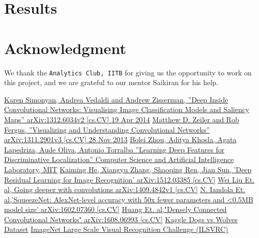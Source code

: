 \documentclass[conference]{IEEEtran}
\begin{document}
\section{Results}



\section*{Acknowledgment}

We thank the \texttt{Analytics Club, IITB} for giving us the opportunity to work on this project, and we are grateful to our mentor Saikiran for his help.
\newpage
\begin{thebibliography}{00}
 \href{https://arxiv.org/pdf/1312.6034.pdf}{Karen Simonyan, Andrea Vedaldi and Andrew Zisserman, ''Deep Inside Convolutional Networks: Visualising
Image Classification Models and Saliency Maps'' arXiv:1312.6034v2 [cs.CV] 19 Apr 2014}
 \href{https://arxiv.org/pdf/1311.2901.pdf}{Matthew D. Zeiler and Rob Fergus, ''Visualizing and Understanding Convolutional Networks'' arXiv:1311.2901v3 [cs.CV] 28 Nov 2013}
 \href{http://cnnlocalization.csail.mit.edu/Zhou_Learning_Deep_Features_CVPR_2016_paper.pdf}{Bolei Zhou, Aditya Khosla, Agata Lapedriza, Aude Oliva, Antonio Torralba ''Learning Deep Features for Discriminative Localization'' Computer Science and Artificial Intelligence Laboratory, MIT}
 \href{https://arxiv.org/pdf/1512.03385.pdf}{Kaiming He, Xiangyu Zhang, Shaoqing Ren, Jian Sun, 'Deep Residual Learning for Image Recognition' arXiv:1512.03385 [cs.CV]}
 \href{https://arxiv.org/pdf/1409.4842.pdf}{Wei Liu Et. al, Going deeper with convolutions arXiv:1409.4842v1 [cs.CV]}
 \href{https://arxiv.org/pdf/1602.07360.pdf}{N. Iandola Et. al,'SqueezeNet: AlexNet-level accuracy with 50x fewer parameters and <0.5MB model size'	arXiv:1602.07360 [cs.CV]}
 \href{https://arxiv.org/pdf/1608.06993.pdf}{Huang Et. al,"Densely Connected Convolutional Networks" arXiv:1608.06993 [cs.CV]}
 \href{https://www.kaggle.com/harishvutukuri/dogs-vs-wolves}{Kaggle Dogs vs Wolves Dataset}
 \href{https://www.kaggle.com/c/imagenet-object-localization-challenge/overview/description}{ImageNet Large Scale Visual Recognition Challenge (ILSVRC)}
\end{thebibliography}
\end{document}
